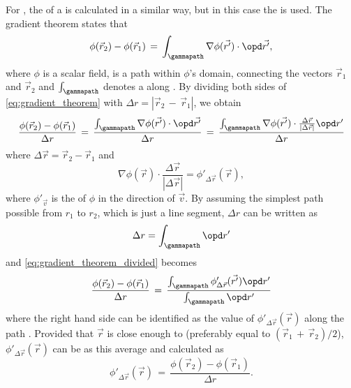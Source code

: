 For , the \gradient of a  is calculated in a similar way, but in this case the  is used. The gradient theorem states that
%
\begin{equation} \label{eq:gradient_theorem}
\phi(\vec{r}_2)-\phi(\vec{r}_1) \,=\, \int_\gammapath\nabla\phi(\vec{r'})\cdot \opd\vec{r'},
\end{equation}
%
where $\phi$ is a scalar field, \textgammapath is a path within $\phi$'s domain, connecting the vectors $\vec{r}_1$ and $\vec{r}_2$ and $\int_\gammapath$ denotes a  along \textgammapath. By dividing both sides of \eqref{eq:gradient_theorem} with \mbox{$\Delta r = |\vec{r}_2\,-\,\vec{r}_1|$}, we obtain
%
\begin{equation} \label{eq:gradient_theorem_divided}
\frac{\phi(\vec{r}_2)-\phi(\vec{r}_1)}{\Delta r} \,=\, \frac{\int_\gammapath\nabla\phi(\vec{r'})\cdot \opd\vec{r'}}{\Delta r} \,=\, \frac{\int_\gammapath\nabla\phi(\vec{r'})\cdot\frac{\Delta\vec{r}}{|\Delta\vec{r}|} \opd r'}{\Delta r}
\end{equation}
%
where $\Delta\vec{r} = \vec{r}_2 -  \vec{r}_1$ and
%
\begin{equation}
\nabla\phi(\vec{r})\cdot\frac{\Delta\vec{r}}{|\Delta\vec{r}|} = \phi'_{\Delta\vec{r}}(\vec{r}),
\end{equation}
%
where $\phi'_{\vec{v}}$ is the \derivative of $\phi$ in the direction of $\vec{v}$. By assuming the simplest path possible from $r_1$ to $r_2$, which is just a line segment, $\Delta r$ can be written as
%
\begin{equation}
\Delta r = \int_\gammapath\opd r'
\end{equation}
%
and \eqref{eq:gradient_theorem_divided} becomes
%
\begin{equation} \label{eq:phi_derivative_integral}
\frac{\phi(\vec{r}_2)-\phi(\vec{r}_1)}{\Delta r} \,=\, \frac{\int_\gammapath\phi'_{\Delta\vec{r}}(\vec{r'})\opd r'}{\int_\gammapath\opd r'}
\end{equation}
%
where the right hand side can be identified as the \average value of $\phi'_{\Delta\vec{r}}(\vec{r})$ along the path \textgammapath. Provided that $\vec{r}$ is close enough to \textgammapath (preferably equal to \mbox{$(\vec{r}_1\,+\,\vec{r}_2)/2$}), $\phi'_{\Delta\vec{r}}(\vec{r})$ can be \approximated as this average and calculated as
%
\begin{equation} \label{eq:phi_derivative_final}
\phi'_{\Delta\vec{r}}(\vec{r}) \,=\, \frac{\phi(\vec{r}_2)-\phi(\vec{r}_1)}{\Delta r}.
\end{equation}

